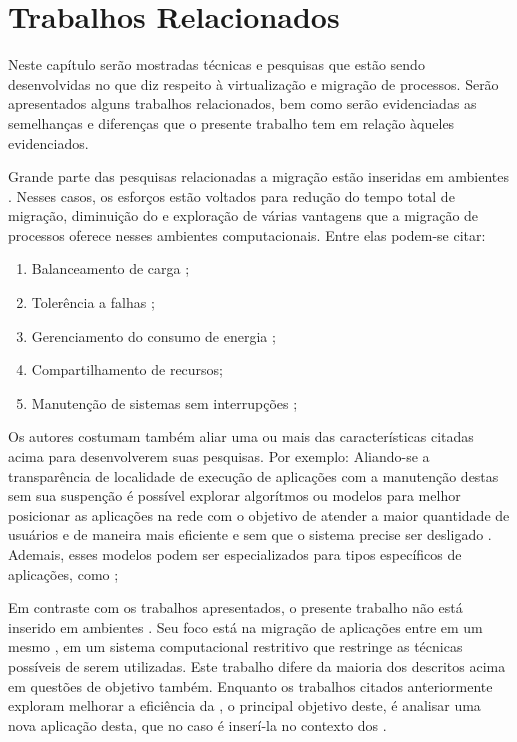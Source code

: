 \glsresetall
\chapter{Trabalhos Relacionados}\label{chap.related-work}

Neste capítulo serão mostradas técnicas e pesquisas que estão sendo desenvolvidas no que diz respeito à virtualização e migração de processos. Serão apresentados alguns trabalhos relacionados, bem como serão evidenciadas as semelhanças e diferenças que o presente trabalho tem em relação àqueles evidenciados.

Grande parte das pesquisas relacionadas a migração estão inseridas em ambientes \cloud. Nesses casos, os esforços estão voltados para redução do tempo total de migração, diminuição do \downtime \cite{migration-linux-conteiners,clark2005live} e exploração de várias vantagens que a migração de processos oferece nesses ambientes computacionais. Entre elas podem-se citar:
\begin{enumerate}[label=(\roman*)]
    \item Balanceamento de carga \cite{live-vm-migration-techniques,ada-things};
    \item Tolerência a falhas \cite{fernando2019live};
    \item Gerenciamento do consumo de energia \cite{aldossary2018performance};
    \item Compartilhamento de recursos;
    \item Manutenção de sistemas sem interrupções \cite{live-vm-migration-techniques,ada-things};
\end{enumerate}

Os autores costumam também aliar uma ou mais das características citadas acima para desenvolverem suas pesquisas. Por exemplo:
    Aliando-se a transparência de localidade de execução de aplicações com a manutenção destas sem sua suspenção é possível explorar algorítmos ou modelos para melhor posicionar as aplicações na rede com o objetivo de atender a maior quantidade de usuários e de maneira mais eficiente e sem que o sistema precise ser desligado \cite{live-migration-sdn}. Ademais, esses modelos podem ser especializados para tipos específicos de aplicações, como \iot \cite{ada-things};

Em contraste com os trabalhos apresentados, o presente trabalho não está inserido em ambientes \cloud. Seu foco está na migração de aplicações entre \clusters em um mesmo \chip, em um sistema computacional restritivo que restringe as técnicas possíveis de serem utilizadas. Este trabalho difere da maioria dos descritos acima em questões de objetivo também. Enquanto os trabalhos citados anteriormente exploram melhorar a eficiência da \livemigration, o principal objetivo deste, é analisar uma nova aplicação desta, que no caso é inserí-la no contexto dos \lws.